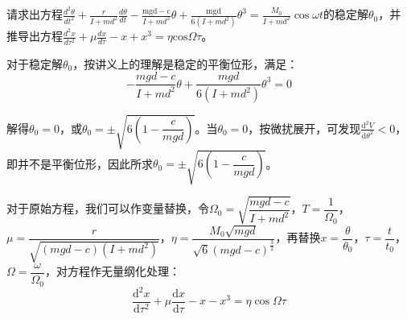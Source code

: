 \documentclass[dvipsnames, svgnames,a4paper,11pt]{article}
\begin{document}
	\begin{question}
		请求出方程$\frac{d^2\theta}{dt^2}+\frac r{I+md^2}\frac{d\theta}{dt}-\frac{\mathrm{mgd-c}}{I+md^2}\theta+\frac{\mathrm{mgd}}{6(I+md^2)}\theta^3=\frac{M_0}{I+md^2}\cos\omega t$的稳定解$\theta_0$，并推导出方程$\frac{d^2x}{d\tau^2}+\mu\frac{dx}{d\tau}-x+x^3=\eta\mathrm{cos}\Omega\tau$。
	\end{question}
	对于稳定解$\theta_0$，按讲义上的理解是稳定的平衡位形，满足：
	\[-\dfrac{mgd-c}{I+md^2}\theta+\dfrac{mgd}{6(I+md^2)}\theta^3=0\]
	
	解得$\theta_0=0$，或$\theta_0=\pm\sqrt{6(1-\dfrac{c}{mgd})}$。当$\theta_0=0$，按微扰展开，可发现$\frac{\mathrm{d}^2V }{\mathrm{d} \theta^2}<0$，即并不是平衡位形，因此所求$\theta_0=\pm\sqrt{6(1-\dfrac{c}{mgd})}$。
	
	对于原始方程，我们可以作变量替换，令$\Omega_0=\sqrt{\dfrac{mgd-c}{I+md^2}}$，$T=\dfrac{1}{\Omega_0}$，$\mu=\dfrac{r}{\sqrt{(mgd-c)(I+md^2)}}$，$\eta=\dfrac{M_0\sqrt{mgd}}{\sqrt{6}(mgd-c)^{\frac{3}{2}}}$，再替换$x=\dfrac{\theta}{\theta_0}$，$\tau=\dfrac{t}{t_0}$，$\Omega=\dfrac{\omega}{\Omega_0}$，对方程作无量纲化处理：
	\[\frac{\mathrm{d}^2x }{\mathrm{d} \tau^2}+\mu\frac{\mathrm{d}x }{\mathrm{d} \tau}-x-x^3=\eta\cos\Omega\tau\]
	
\end{document}
